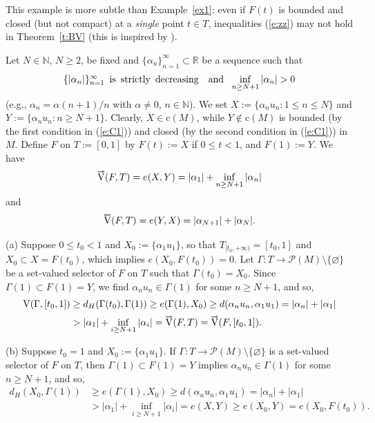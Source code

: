 \documentclass[preprint,12pt]{elsarticle}
\newcommand{\eq}[1]{\mbox{\rm(\ref{#1})}}
\newcommand{\Rb}{\mathbb{R}}  \newcommand{\Nb}{\mathbb{N}}
\newcommand{\es}{\varnothing}
\newcommand{\nV}{\mbox{\rm V}}
\newcommand{\riV}{{\scriptstyle\overrightarrow{\mbox{\rm V}}}}
\newcommand{\leV}{{\scriptstyle\overleftarrow{\mbox{\rm V}}}}
\begin{document}
\begin{exa} \label{ex2}
This example is more subtle than Example~\ref{ex1}: even if $F(t)$ is bounded and
closed (but not compact) at a \emph{single\/} point $t\in T$, inequalities \eq{e:zz}
may not hold in Theorem~\ref{t:BV} (this is inspired by \cite[Example~5.2]{Sovae}).

Let $N\in\Nb$, $N\ge2$, be fixed and $\{\alpha_n\}_{n=1}^\infty\subset\Rb$ be
a sequence such that
  \begin{equation} \label{e:C1}
\mbox{$\{|\alpha_n|\}_{n=1}^\infty$ \,is \,strictly \,decreasing}\quad
\mbox{and}\!\!\quad\inf_{n\ge N+1}|\alpha_n|>0
  \end{equation}
(e.g., $\alpha_n=\alpha(n+1)/n$ with $\alpha\ne0$, $n\in\Nb$). We set
$X:=\{\alpha_nu_n:1\le n\le N\}$ and $Y:=\{\alpha_nu_n:n\ge N+1\}$.
Clearly, $X\in\mbox{c}(M)$, while $Y\notin\mbox{c}(M)$ is bounded (by the first
condition in \eq{e:C1}) and closed (by the second condition in \eq{e:C1}) in $M$.
Define $F$ on $T:=[0,1]$ by $F(t)\!:=X$ if $0\le t<1$, and $F(1)\!:=Y$. We have
  \begin{equation*}
\riV(F,T)=e(X,Y)=|\alpha_1|+\inf_{n\ge N+1}|\alpha_n|
  \end{equation*}
and
  \begin{equation*}
\leV(F,T)=e(Y,X)=|\alpha_{N+1}|+|\alpha_N|.
  \end{equation*}

(a) Suppose $0\le t_0<1$ and $X_0:=\{\alpha_1u_1\}$, so that
$T_{[t_0,+\infty)}=[t_0,1]$ and $X_0\subset X=F(t_0)$, which implies
$e(X_0,F(t_0))=0$. Let $\Gamma:T\to\mathcal{P}(M)\setminus\{\es\}$ be a
set-valued selector of $F$ on $T$ such that $\Gamma(t_0)=X_0$. Since
$\Gamma(1)\subset F(1)=Y$, we find $\alpha_nu_n\in\Gamma(1)$ for some
$n\ge N+1$, and so,
  \begin{align*}
\nV(\Gamma,[t_0,1])&\ge d_H(\Gamma(t_0),\Gamma(1))\ge e (\Gamma(1),X_0)
  \ge d(\alpha_nu_n,\alpha_1u_1)=|\alpha_n|+|\alpha_1|\\[2pt]
&>|\alpha_1|+\inf_{i\ge N+1}|\alpha_i|=\riV(F,T)=\riV(F,[t_0,1]).
  \end{align*}

(b) Suppose $t_0=1$ and $X_0:=\{\alpha_1u_1\}$. If
$\Gamma:T\to\mathcal{P}(M)\setminus\{\es\}$ is a set-valued selector of $F$ on $T$,
then $\Gamma(1)\subset F(1)=Y$ implies $\alpha_nu_n\in\Gamma(1)$ for some
$n\ge N+1$, and so,
  \begin{align*}
d_H(X_0,\Gamma(1))&\ge e(\Gamma(1),X_0)\ge d(\alpha_nu_n,\alpha_1u_1)
  =|\alpha_n|+|\alpha_1|\\[2pt]
&>|\alpha_1|+\inf_{i\ge N+1}|\alpha_i|=e(X,Y)\ge e(X_0,Y)=e(X_0,F(t_0)).
  \end{align*}


\end{exa}
\end{document}
